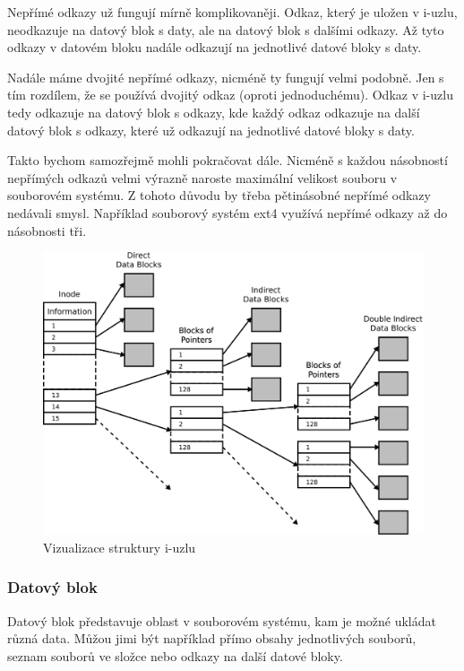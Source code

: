 \documentclass[12pt, a4paper]{article}
\begin{document}
    Nepřímé odkazy už fungují mírně komplikovaněji.
    Odkaz, který je uložen v i-uzlu, neodkazuje na datový blok s daty, ale na datový blok s dalšími odkazy.
    Až tyto odkazy v datovém bloku nadále odkazují na jednotlivé datové bloky s daty.

    Nadále máme dvojité nepřímé odkazy, nicméně ty fungují velmi podobně.
    Jen s tím rozdílem, že se používá dvojitý odkaz (oproti jednoduchému).
    Odkaz v i-uzlu tedy odkazuje na datový blok s odkazy, kde každý odkaz odkazuje na další datový blok s odkazy, které už odkazují na jednotlivé datové bloky s daty.

    Takto bychom samozřejmě mohli pokračovat dále.
    Nicméně s každou násobností nepřímých odkazů velmi výrazně naroste maximální velikost souboru v souborovém systému.
    Z tohoto důvodu by třeba pětinásobné nepřímé odkazy nedávali smysl.
    Například souborový systém ext4 využívá nepřímé odkazy až do násobnosti tři.

    \begin{figure}
        \centering
        \includegraphics[width=\textwidth]{inode.png}
        \caption{Vizualizace struktury i-uzlu}
    \end{figure}

    \subsubsection{Datový blok}
    Datový blok představuje oblast v souborovém systému, kam je možné ukládat různá data.
    Můžou jimi být například přímo obsahy jednotlivých souborů, seznam souborů ve složce nebo odkazy na další datové bloky.
\end{document}
